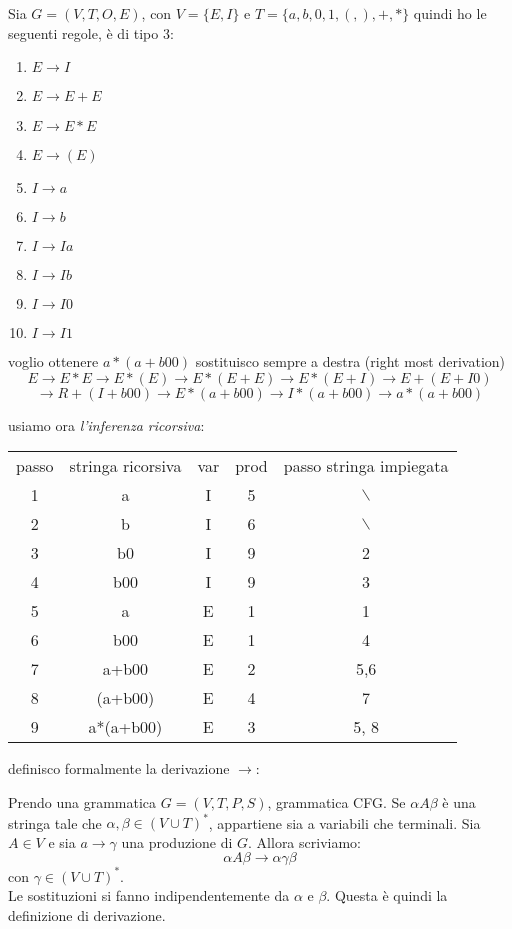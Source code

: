 \documentclass[a4paper,12pt, oneside]{book}
\begin{document}
\newpage
\begin{esempio}
Sia $G=(V,T,O,E)$, con $V=\{E,I\}$ e $T=\{a,b,0,1,(,),+,*\}$ 
quindi ho le seguenti regole, è di tipo 3:
\begin{enumerate}
\item $E\to I$
\item $E\to E+E$
\item $E\to E*E$
\item $E\to (E)$
\item $I\to a$
\item $I\to b$
\item $I\to Ia$
\item $I\to Ib$
\item $I\to I0$
\item $I\to I1$
\end{enumerate}
voglio ottenere $a*(a+b00)$ 
sostituisco sempre a destra (right most derivation)
$$E\to E*E\to E*(E)\to E*(E+E)\to E*(E+I)\to E+(E+I0)$$
$$\to R+(I+b00)\to E*(a+b00)\to I*(a+b00)\to a*(a+b00)$$

usiamo ora \textit{l'inferenza ricorsiva}:
\begin{center}
\begin{tabular}{|c|c|c|c|c|}
\hline
passo & stringa ricorsiva & var & prod & passo stringa impiegata\\
1 & a & I & 5 & $\backslash$ \\
\hline
2 & b & I & 6 & $\backslash$ \\ 
\hline
3 & b0 & I & 9 & 2\\
\hline
4 & b00 & I & 9 & 3\\
\hline
5 & a & E & 1 & 1 \\
\hline
6 & b00 & E & 1 & 4\\
\hline
7 & a+b00 & E & 2 & 5,6\\
\hline
8 & (a+b00) & E & 4 & 7\\
\hline
9 &a*(a+b00) & E & 3 & 5, 8\\
\hline
\end{tabular}
\end{center}
\end{esempio}
definisco formalmente la derivazione $\to$:
\begin{definizione}
Prendo una grammatica $G=(V,T,P,S)$, grammatica CFG. Se $\alpha A \beta$ è una stringa tale che $\alpha,\beta\in (V\cup T)^*$, appartiene sia a variabili che terminali. Sia $A\in V$ e sia $a\to \gamma$ una produzione di $G$. Allora 
scriviamo:
$$\alpha A \beta \to \alpha\gamma\beta$$
con $\gamma\in (V\cup T)^*$.\\
Le sostituzioni si fanno indipendentemente da $\alpha$ e $\beta$.
Questa è quindi la definizione di derivazione.
\end{definizione}
\end{document}
